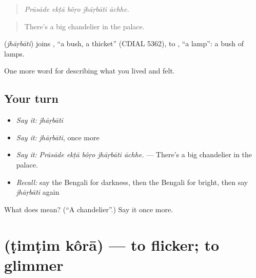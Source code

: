 \begin{quote}
    
\end{quote}

\begin{quote}
\emph{Prāsāde ekṭā bôṛo jhāṛbāti āchhe.}
\end{quote}

\begin{quote}
There's a big chandelier in the palace.
\end{quote}

\begin{cousinweb}
\textbf{} (\emph{jhāṛbāti}) joins , \textquotedblleft{}a bush, a thicket\textquotedblright{} (CDIAL 5362), to , \textquotedblleft{}a lamp\textquotedblright{}: a bush of lamps.
\end{cousinweb}

\begin{grammarlens}[title={What you've built}]
One more word for describing what you lived and felt.
\end{grammarlens}

\subsection*{Your turn}
\begin{itemize}
\raggedright
  \item \emph{Say it:} \emph{jhāṛbāti}
  \item \emph{Say it:} \emph{jhāṛbāti}, once more
  \item \emph{Say it:} \emph{Prāsāde ekṭā bôṛo jhāṛbāti āchhe.} — There's a big chandelier in the palace.
  \item \emph{Recall:} say the Bengali for darkness, then the Bengali for bright, then say \emph{jhāṛbāti} again
\end{itemize}

\begin{tcolorbox}[breakable,colback=teal!4,colframe=teal!35!black,title={Before you move on}]
What does  mean? (\textquotedblleft{}A chandelier\textquotedblright{}.) Say it once more.
\end{tcolorbox}
\section[\texorpdfstring{\bn{টিমটিম} \bn{করা} (ṭimṭim kôrā)}{টিমটিম করা (ṭimṭim kôrā)}]{  (ṭimṭim kôrā) — to flicker; to glimmer}

